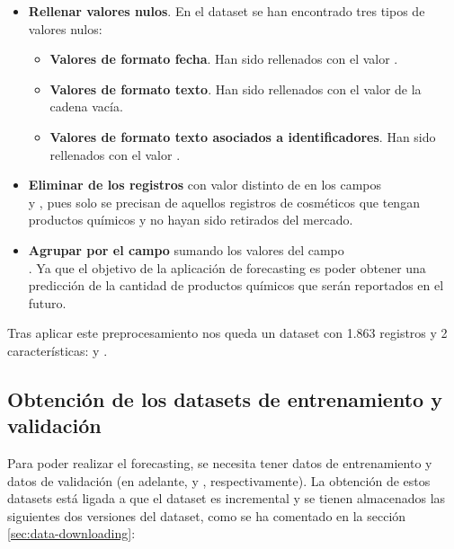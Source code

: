 \begin{itemize}
 \item \textbf{Rellenar valores nulos}. En el dataset se han encontrado tres tipos de valores nulos: 
 \begin{itemize}
  \item \textbf{Valores de formato fecha}. Han sido rellenados con el valor .
  \item \textbf{Valores de formato texto}. Han sido rellenados con el valor de la cadena vacía.
  \item \textbf{Valores de formato texto asociados a identificadores}. Han sido rellenados con el valor .
 \end{itemize}
 
 \item \textbf{Eliminar de los registros} con valor distinto de  en los campos \\  y , pues solo se precisan de aquellos registros de cosméticos que tengan productos químicos y no hayan sido retirados del mercado.

 \item \textbf{Agrupar por el campo}  sumando los valores del campo \\ . Ya que el objetivo de la aplicación de forecasting es poder obtener una predicción de la cantidad de productos químicos que serán reportados en el futuro.
\end{itemize}

Tras aplicar este preprocesamiento nos queda un dataset con 1.863 registros y 2 características:  y .




\subsection{Obtención de los datasets de entrenamiento y validación}
\label{sec:dataset-validation}

Para poder realizar el forecasting, se necesita tener datos de entrenamiento y datos de validación (en adelante,  y , respectivamente). La obtención de estos datasets está ligada a que el dataset \citep{dataset} es incremental y se tienen almacenados las siguientes dos versiones del dataset, como se ha comentado en la sección \ref{sec:data-downloading}:

